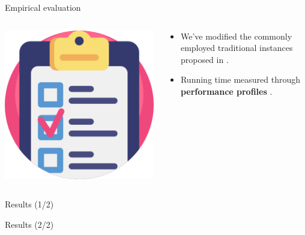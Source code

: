\begin{frame}{Empirical evaluation}
	\begin{columns}
		\begin{column}{0.2\textwidth}
			\centering
			\includegraphics[width=\textwidth]{./Imgs/testing.png}
		\end{column}
		\begin{column}{0.8\textwidth}
			\begin{itemize}
				\item We've modified the commonly employed traditional instances proposed in
				      \cite{dantzig1959, christofides1969, gaskell1967bases, gillett1974heuristic,christofides1979vehicle,fisher1994,augerat1995}.

				\item Running time measured through \textbf{performance profiles} \parencite{dolan2002}.
			\end{itemize}
		\end{column}
	\end{columns}
\end{frame}

\begin{frame}{Results (1/2)}

\end{frame}

\begin{frame}{Results (2/2)}

\end{frame}

